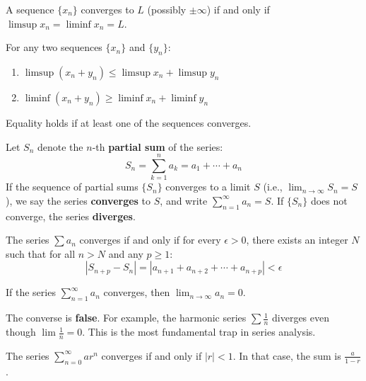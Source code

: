 \documentclass[oneside]{book}
\begin{document}
\begin{theorem}
A sequence $\{x_n\}$ converges to $L$ (possibly $\pm \infty$) if and only if $\limsup x_n = \liminf x_n = L$.
\end{theorem}

\begin{property}
For any two sequences $\{x_n\}$ and $\{y_n\}$:
\begin{enumerate}
    \item $\limsup (x_n + y_n) \le \limsup x_n + \limsup y_n$
    \item $\liminf (x_n + y_n) \ge \liminf x_n + \liminf y_n$
\end{enumerate}
Equality holds if at least one of the sequences converges.
\end{property}

\newpage

\begin{definition}[Convergence]
Let $S_n$ denote the $n$-th \textbf{partial sum} of the series:
\[ S_n = \sum_{k=1}^{n} a_k = a_1 + \cdots + a_n \]
If the sequence of partial sums $\{S_n\}$ converges to a limit $S$ (i.e., $\lim_{n \to \infty} S_n = S$), we say the series \textbf{converges} to $S$, and write $\sum_{n=1}^{\infty} a_n = S$.
If $\{S_n\}$ does not converge, the series \textbf{diverges}.
\end{definition}

\begin{theorem}
The series $\sum a_n$ converges if and only if for every $\epsilon > 0$, there exists an integer $N$ such that for all $n > N$ and any $p \ge 1$:
\[ |S_{n+p} - S_n| = |a_{n+1} + a_{n+2} + \cdots + a_{n+p}| < \epsilon \]
\end{theorem}

\begin{theorem}
If the series $\sum_{n=1}^{\infty} a_n$ converges, then $\lim_{n \to \infty} a_n = 0$.
\end{theorem}
\begin{remark}
The converse is \textbf{false}. For example, the harmonic series $\sum \frac{1}{n}$ diverges even though $\lim \frac{1}{n} = 0$. This is the most fundamental trap in series analysis.
\end{remark}

\begin{example}
The series $\sum_{n=0}^{\infty} ar^n$ converges if and only if $|r| < 1$. In that case, the sum is $\frac{a}{1-r}$.
\end{example}
\end{document}

